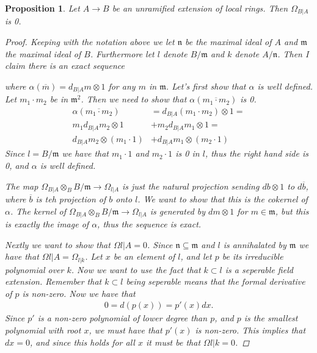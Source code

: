 \documentclass[11pt, a4paper, english]{article}
\newtheorem{prop}{Proposition}
\numberwithin{prop}{section}
\numberwithin{lemma}{section}
\numberwithin{theorem}{section}
\numberwithin{defin}{section}
\numberwithin{example}{section}
\begin{document}
\begin{prop}
Let $A \to B$ be an unramified extension of local rings. Then $\Omega_{B|A}$ is 0.

\begin{proof}
Keeping with the notation above we let $\mathfrak{n}$ be the maximal ideal of $A$ and $\mathfrak{m}$ the maximal ideal of $B$. Furthermore let $l$ denote $B/\mathfrak{m}$ and $k$ denote $A/\mathfrak{n}$. Then I claim there is an exact sequence
\begin{center}
\end{center}
where $\alpha(\overline{m}) = d_{B|A}m \otimes 1$ for any $m$ in $\mathfrak{m}$. Let's first show that $\alpha$ is well defined. Let $m_1 \cdot m_2$ be in $\mathfrak{m}^2$. Then we need to show that $\alpha(\overline{m_1 \cdot m_2})$ is 0. 
\begin{align*}
\alpha(\overline{m_1 \cdot m_2}) &= d_{B|A}(m_1 \cdot m_2) \otimes 1 =\\ 
m_1 d_{B|A}m_2 \otimes 1 &+ m_2d_{B|A}m_1 \otimes 1 =\\ 
d_{B|A}m_2 \otimes (m_1 \cdot 1) &+ d_{B|A}m_1 \otimes (m_2 \cdot 1)
\end{align*}
Since $l = B/\mathfrak{m}$ we have that $m_1 \cdot 1$ and $m_2 \cdot 1$ is 0 in $l$, thus the right hand side is 0, and $\alpha$ is well defined.

The map $\Omega_{B|A} \otimes_B B/\mathfrak{m} \to \Omega_{l|A}$ is just the natural projection sending $db \otimes 1$ to $d\overline{b}$, where $\overline{b}$ is teh projection of $b$ onto $l$. We want to show that this is the cokernel of $\alpha$. The kernel of $\Omega_{B|A} \otimes_B B/\mathfrak{m} \to \Omega_{l|A}$ is generated by $dm \otimes 1$ for $m \in \mathfrak{m}$, but this is exactly the image of $\alpha$, thus the sequence is exact.

Nextly we want to show that $\Omega{l|A} = 0$. Since $\mathfrak{n} \subseteq \mathfrak{m}$ and $l$ is annihalated by $\mathfrak{m}$ we have that $\Omega{l|A} = \Omega_{l|k}$. Let $x$ be an element of $l$, and let $p$ be its irreducible polynomial over $k$. Now we want to use the fact that $k \subset l$ is a seperable field extension. Remember that $k \subset l$ being seperable means that the formal derivative of $p$ is non-zero. Now we have that 
\begin{align*}
0 = d(p(x)) = p'(x)dx.
\end{align*}
Since $p'$ is a non-zero polynomial of lower degree than $p$, and $p$ is the smallest polynomial with root $x$, we must have that $p'(x)$ is non-zero. This implies that $dx=0$, and since this holds for all $x$ it must be that $\Omega{l|k}=0$.


\end{proof}
\end{prop}
\end{document}
